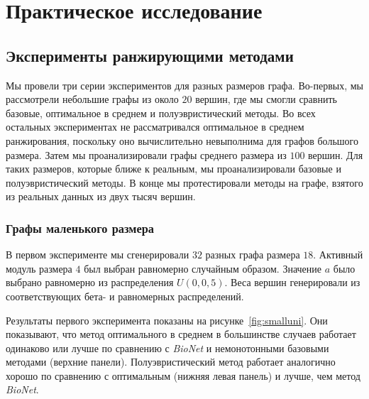 \chapter{Практическое исследование}





\section{Эксперименты ранжирующими методами}
\label{sec_experiments}

Мы провели три серии экспериментов для разных размеров графа.  Во-первых, мы
рассмотрели небольшие графы из около $20$ вершин, где мы смогли сравнить базовые,
оптимальное в среднем и полуэвристический методы.  Во всех остальных
экспериментах не рассматривался оптимальное в среднем ранжирования, поскольку
оно вычислительно невыполнима для графов большого размера.  Затем мы
проанализировали графы среднего размера из $100$ вершин.  Для таких размеров,
которые ближе к реальным, мы проанализировали базовые и полуэвристический
методы.  В конце мы протестировали методы на графе, взятого из реальных данных
из двух тысяч вершин.





\subsection{Графы маленького размера}

В первом эксперименте мы сгенерировали $32$ разных графа размера $18$.
Активный модуль размера $4$ был выбран равномерно случайным образом.  Значение
$a$ было выбрано равномерно из распределения $U(0, 0,5)$.  Веса вершин
генерировали из соответствующих бета- и равномерных распределений.

Результаты первого эксперимента показаны на рисунке~\ref{fig:smalluni}.  Они
показывают, что метод оптимального в среднем в большинстве случаев работает
одинаково или лучше по сравнению с \emph{BioNet} и немонотонными базовыми
методами (верхние панели).  Полуэвристический метод работает аналогично хорошо
по сравнению с оптимальным (нижняя левая панель) и лучше, чем метод
\emph{BioNet}.

